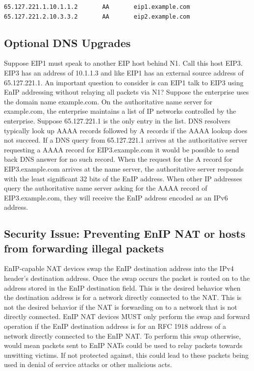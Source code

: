 \begin{verbatim}
65.127.221.1.10.1.1.2       AA       eip1.example.com
65.127.221.2.10.3.3.2       AA       eip2.example.com
\end{verbatim}


\subsection{Optional DNS Upgrades}
Suppose EIP1 must speak to another EIP host behind N1.
Call this host EIP3. EIP3 has an address of 10.1.1.3 and like EIP1 has an 
external source address of 65.127.221.1. An important question to consider is can EIP1 talk 
to EIP3 using EnIP addressing without relaying all packets via N1?  Suppose the enterprise uses the domain name
example.com.  On the authoritative name server for example.com, the enterprise maintains a list of IP networks controlled by the
enterprise.  Suppose 65.127.221.1 is the only entry in the list.  DNS resolvers typically look up AAAA records followed by A records
if the AAAA lookup does not succeed.  If a DNS query from 65.127.221.1 arrives at the authoritative server requesting a AAAA record
for EIP3.example.com it would be possible to send back DNS answer for no such record.  When the request for the A record for EIP3.example.com
arrives at the name server, the authoritative server responds with the least significant 32 bits of the EnIP address.  When other
IP addresses query the authoritative name server asking for the AAAA record of EIP3.example.com, they will receive the EnIP address encoded as an IPv6 address.

\subsection{Security Issue: Preventing EnIP NAT or hosts from forwarding illegal packets}
EnIP-capable NAT devices swap the EnIP destination address into the IPv4 header's destination address.  Once the swap occurs the packet
is routed on to the address stored in the EnIP destination field.  This is the desired behavior when the destination address is for a network directly connected
to the NAT.  This is not the desired behavior if the NAT is forwarding on to a network that is not directly connected.  EnIP NAT devices MUST only perform
the swap and forward operation if the EnIP destination address is for an RFC 1918 address of a network directly connected to the EnIP NAT.  
To perform this swap otherwise, would mean packets sent to EnIP NATs could be used to relay packets towards
unwitting victims.  If not protected against, this could lead to these packets being used in denial of service attacks or other malicious acts.


